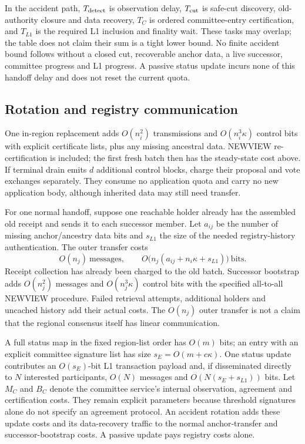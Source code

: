 In the accident path, $T_{\rm detect}$ is observation delay,
$T_{\rm cut}$ is safe-cut discovery, old-authority closure and data recovery,
$T_C$ is ordered committee-entry certification, and $T_{L1}$ is the
required L1 inclusion and finality wait. These tasks may overlap; the table
does not claim their sum is a tight lower bound. No finite accident bound
follows without a closed cut, recoverable anchor data, a live successor,
committee progress and L1 progress. A passive status update incurs none
of this handoff delay and does not reset the current quota.

\subsection{Rotation and registry communication}
One in-region replacement adds $O(n_i^2)$ transmissions and
$O(n_i^3\kappa)$ control bits with explicit certificate lists, plus any
missing ancestral data. NEWVIEW re-certification is included; the first
fresh batch then has the steady-state cost above. If terminal drain emits
$d$ additional control blocks, charge their proposal and vote exchanges
separately. They consume no application quota and carry no new application
body, although inherited data may still need transfer.

For one normal handoff, suppose one reachable holder already has the
assembled old receipt and sends it to each successor member. Let $a_{ij}$
be the number of missing anchor/ancestry data bits and $s_{L1}$ the size of
the needed registry-history authentication. The outer transfer costs
\[
 O(n_j)\ \text{messages},\qquad
 O\bigl(n_j(a_{ij}+n_i\kappa+s_{L1})\bigr)\ \text{bits}.
\]
Receipt collection has already been charged to the old batch. Successor
bootstrap adds $O(n_j^2)$ messages and $O(n_j^3\kappa)$ control bits with
the specified all-to-all NEWVIEW procedure. Failed retrieval attempts,
additional holders and uncached history add their actual costs. The
$O(n_j)$ outer transfer is not a claim that the regional consensus itself
has linear communication.

A full status map in the fixed region-list order has $O(m)$ bits; an
entry with an explicit committee signature list has size
$s_E=O(m+c\kappa)$. One status update contributes an $O(s_E)$-bit L1
transaction payload and, if disseminated directly to $N$ interested
participants, $O(N)$ messages and $O(N(s_E+s_{L1}))$ bits. Let $M_C$ and
$B_C$ denote the committee service's internal observation, agreement and
certification costs. They remain explicit parameters because threshold
signatures alone do not specify an agreement protocol. An accident
rotation adds these update costs and its data-recovery traffic to the
normal anchor-transfer and successor-bootstrap costs. A passive update
pays registry costs alone.

